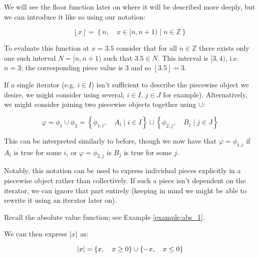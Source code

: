 \begin{example}
    We will see the floor function later on where it will be described more deeply, but we can introduce it like so using our notation:

    $$
        \left\lfloor x\right\rfloor=\left\{n,\quad x\in[n,n+1)\mid n\in\mathbb{Z}\right\}
    $$

    To evaluate this function at $x=3.5$ consider that for all $n\in\mathbb{Z}$ there exists only one such interval $N=[n,n+1)$ such that $3.5\in N$. This interval is $[3,4)$, i.e. $n=3$; the corresponding piece value is $3$ and so $\left\lfloor 3.5\right\rfloor=3$.
\end{example}

If a single iterator (e.g. $i\in I$) isn't sufficient to describe the piecewise object we desire, we might consider using several; $i\in I$, $j\in J$ for example). Alternatively, we might consider joining two piecewise objects together using $\cup$:

$$
\varphi = \phi_1 \cup \phi_2 = \left\{\phi_{1,i},\quad A_i\mid i\in I\right\}\cup\left\{\phi_{2,j},\quad B_j\mid j\in J\right\}
$$

This can be interpreted similarly to before, though we now have that $\varphi=\phi_{1,i}$ if $A_i$ is true for some $i$, or $\varphi=\phi_{2,j}$ is $B_j$ is true for some $j$. 

Notably, this notation can be used to express individual pieces explicitly in a piecewise object rather than collectively. If such a piece isn't dependent on the iterator, we can ignore that part entirely (keeping in mind we might be able to rewrite it using an iterator later on).

\begin{example}
    \label{example:abs_2}

    Recall the absolute value function; see Example \ref{example:abs_1}.

    We can then express $\abs{x}$ as:

    $$
        \abs{x} = \{x,\quad x\geq 0\} \cup \{-x,\quad x\leq 0\} 
    $$
\end{example}

\newpage{}